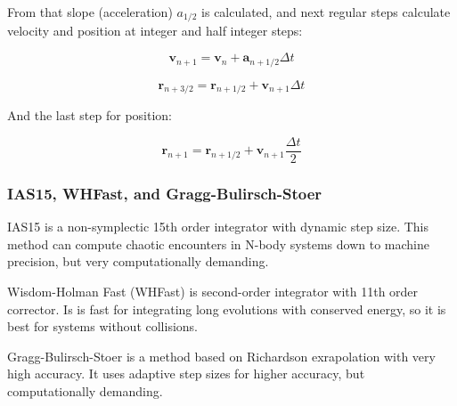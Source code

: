 \documentclass[12pt,a4paper]{article}
\begin{document}
From that slope (acceleration) $a_{1/2}$ is calculated, and next regular steps calculate velocity and position at integer and half integer steps:

\begin{equation}
	\textbf{v}_{n+1} = \textbf{v}_n + \textbf{a}_{n+1/2} \Delta t
\end{equation}

\begin{equation}
	\textbf{r}_{n+3/2} = \textbf{r}_{n+1/2} + \textbf{v}_{n+1} \Delta t
\end{equation}

And the last step for position:

\begin{equation}
	\textbf{r}_{n+1} = \textbf{r}_{n+1/2} + \textbf{v}_{n+1} \frac{\Delta t}{2}
\end{equation}

\subsubsection{IAS15, WHFast, and Gragg-Bulirsch-Stoer}

IAS15 is a non-symplectic 15th order integrator with dynamic step size. This method can compute chaotic encounters in N-body systems down to machine precision, but very computationally demanding.

Wisdom-Holman Fast (WHFast) is second-order integrator with 11th order corrector. Is is fast for integrating long evolutions with conserved energy, so it is best for systems without collisions.

Gragg-Bulirsch-Stoer is a method based on Richardson exrapolation with very high accuracy. It uses adaptive step sizes for higher accuracy, but computationally demanding.


\end{document}
